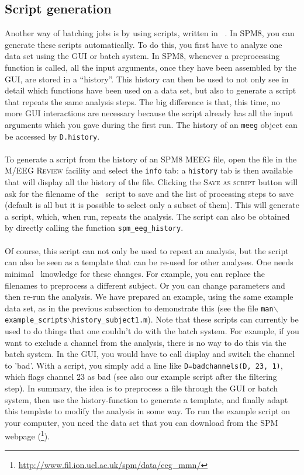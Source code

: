 \subsection{Script generation}
Another way of batching jobs is by using scripts, written in \matlab\ . In SPM8, you can generate these scripts automatically. To do this, you first have to analyze one data set using the GUI or batch system. In SPM8, whenever a preprocessing function is called, all the input arguments, once they have been assembled by the GUI, are stored in a ``history''. This history can then be used to not only see in detail which functions have been used on a data set, but also to generate a script that repeats the same analysis steps. The big difference is that, this time, no more GUI interactions are necessary because the script already has all the input arguments which you gave during the first run. The history of an \texttt{meeg} object can be accessed by \texttt{D.history}. 
\\
\\
To generate a script from the history of an SPM8 MEEG file, open the file in the M/EEG \textsc{Review} facility and select the \texttt{info} tab: a \texttt{history} tab is then available that will display all the history of the file. Clicking the \textsc{Save as script} button will ask for the filename of the \matlab\ script to save and the list of processing steps to save (default is all but it is possible to select only a subset of them). This will generate a script, which, when run, repeats the analysis. The script can also be obtained by directly calling the function \texttt{spm\_eeg\_history}.
\\
\\
Of course, this script can not only be used to repeat an analysis, but the script can also be seen as a template that can be re-used for other analyses. One needs minimal \matlab\ knowledge for these changes. For example, you can replace the filenames to preprocess a different subject. Or you can change parameters and then re-run the analysis. We have prepared an example, using the same example data set, as in the previous subsection to demonstrate this (see the file \texttt{man$\backslash$example\_scripts$\backslash$history_subject1.m}). Note that these scripts can currently be used to do things that one couldn't do with the batch system. For example, if you want to exclude a channel from the analysis, there is no way to do this via the batch system. In the GUI, you would have to call display and switch the channel to 'bad'. With a script, you simply add a line like \texttt{D=badchannels(D, 23, 1)}, which flags channel 23 as bad (see also our example script after the filtering step). In summary, the idea is to preprocess a file through the GUI or batch system, then use the history-function to generate a template, and finally adapt this template to modify the analysis in some way. To run the example script on your computer, you need the data set that you can download from the SPM webpage (\footnote{\url{http://www.fil.ion.ucl.ac.uk/spm/data/eeg\_mmn/}}).
